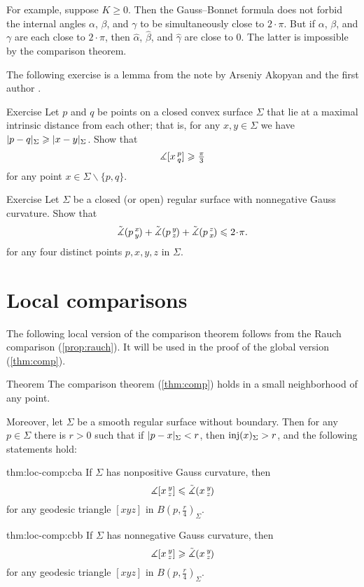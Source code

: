 For example, suppose $K\ge 0$.
Then the Gauss--Bonnet formula does not forbid the internal angles $\alpha$, $\beta$, and $\gamma$ to be simultaneously close to $2\cdot\pi$.
But if $\alpha$, $\beta$, and $\gamma$ are each close to $2\cdot\pi$, then $\hat\alpha$, $\hat\beta$, and $\hat\gamma$ are close to $0$.
The latter is impossible by the comparison theorem.

The following exercise is a lemma from the note by Arseniy Akopyan and the first author \cite{akopyan-petrunin}.

\begin{thm}{Exercise}\label{ex:diam-angle}
Let $p$ and $q$ be points on a closed convex surface $\Sigma$ that lie at a maximal intrinsic distance from each other;
that is, for any $x,y\in \Sigma$ we have $\dist{p}{q}\Sigma\z\ge\dist{x}{y}\Sigma$.
Show that 
\[\measuredangle[x\,{}^{p}_{q}]\geqslant \tfrac\pi3\]
for any point $x\in \Sigma\backslash\{p,q\}$.
\end{thm}

\begin{thm}{Exercise}\label{ex:sum=<2pi}
Let $\Sigma$ be a closed (or open) regular surface with nonnegative Gauss curvature.
Show that 
\[\modangle pxy+\modangle pyz+\modangle pzx\le2\cdot \pi.\]
for any four distinct points $p,x,y,z$ in $\Sigma$.
\end{thm}

\section{Local comparisons}\label{sec:loc-comp}

The following local version of the comparison theorem follows from the Rauch comparison (\ref{prop:rauch}).
It will be used in the proof of the global version (\ref{thm:comp}).

\begin{thm}{Theorem}\label{thm:loc-comp}
The comparison theorem (\ref{thm:comp}) holds in a small neighborhood of any point.

Moreover, let $\Sigma$ be a smooth regular surface without boundary.
Then for any $p\in \Sigma$ there is $r>0$ such that if $\dist{p}{x}\Sigma<r$, then $\mathop{\rm inj}\nolimits(x)_\Sigma>r$, and the following statements hold:

\begin{subthm}{thm:loc-comp:cba}
If $\Sigma$ has nonpositive Gauss curvature, then 
\[\measuredangle[x\,{}^{y}_{z}]\leqslant\tilde\measuredangle(x\,{}^{y}_{z}\hspace{-0.2ex})\]
for any geodesic triangle $[xyz]$ in $B(p,\tfrac r4)_\Sigma$.
\end{subthm}

\begin{subthm}{thm:loc-comp:cbb}
If $\Sigma$ has nonnegative Gauss curvature, then 
\[\measuredangle[x\,{}^{y}_{z}]\geqslant\tilde\measuredangle(x\,{}^{y}_{z}\hspace{-0.2ex})\]
for any geodesic triangle $[xyz]$ in $B(p,\tfrac r4)_\Sigma$.
\end{subthm}

\end{thm}

